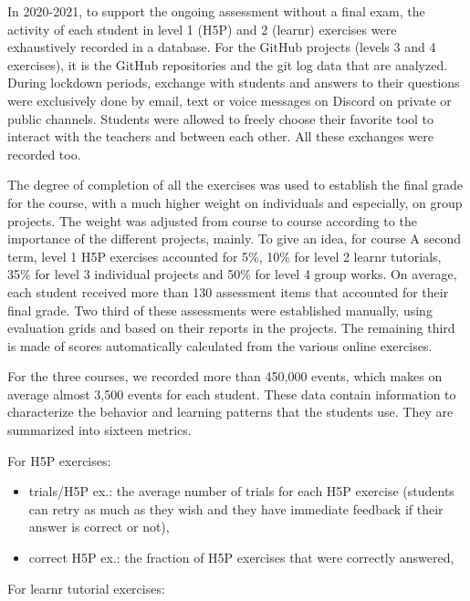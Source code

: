 \documentclass{aims}
\theoremstyle{definition}
\begin{document}
In 2020-2021, to support the ongoing assessment without a final exam,
the activity of each student in level 1 (H5P) and 2 (learnr) exercises
were exhaustively recorded in a database. For the GitHub projects
(levels 3 and 4 exercises), it is the GitHub repositories and the git
log data that are analyzed. During lockdown periods, exchange with
students and answers to their questions were exclusively done by email,
text or voice messages on Discord on private or public channels.
Students were allowed to freely choose their favorite tool to interact
with the teachers and between each other. All these exchanges were
recorded too.

The degree of completion of all the exercises was used to establish the
final grade for the course, with a much higher weight on individuals and
especially, on group projects. The weight was adjusted from course to
course according to the importance of the different projects, mainly. To
give an idea, for course A second term, level 1 H5P exercises accounted
for 5\%, 10\% for level 2 learnr tutorials, 35\% for level 3 individual
projects and 50\% for level 4 group works. On average, each student
received more than 130 assessment items that accounted for their final
grade. Two third of these assessments were established manually, using
evaluation grids and based on their reports in the projects. The
remaining third is made of scores automatically calculated from the
various online exercises.

For the three courses, we recorded more than 450,000 events, which makes
on average almost 3,500 events for each student. These data contain
information to characterize the behavior and learning patterns that the
students use. They are summarized into sixteen metrics.

For H5P exercises:

\begin{itemize}
\item
  trials/H5P ex.: the average number of trials for each H5P exercise
  (students can retry as much as they wish and they have immediate
  feedback if their answer is correct or not),
\item
  correct H5P ex.: the fraction of H5P exercises that were correctly
  answered,
\end{itemize}

For learnr tutorial exercises:
\end{document}
